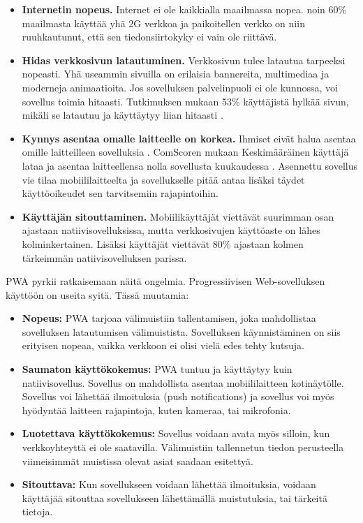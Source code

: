 \documentclass{tktltiki}
\begin{document}
\begin{itemize}
  \item \textbf{Internetin nopeus.} Internet ei ole kaikkialla maailmassa nopea. noin 60\% maailmasta käyttää yhä 2G verkkoa \cite{Kapoor} ja paikoitellen verkko on niin ruuhkautunut, että sen tiedonsiirtokyky ei vain ole riittävä.
  \item \textbf{Hidas verkkosivun latautuminen.} Verkkosivun tulee latautua tarpeeksi nopeasti. Yhä useammin sivuilla on erilaisia bannereita, multimediaa ja moderneja animaatioita. Jos sovelluksen palvelinpuoli ei ole kunnossa, voi sovellus toimia hitaasti. Tutkimuksen mukaan 53\% käyttäjistä hylkää sivun, mikäli se latautuu ja käyttäytyy liian hitaasti \cite{Kapoor}.
  \item \textbf{Kynnys asentaa omalle laitteelle on korkea.} Ihmiset eivät halua asentaa omille laitteilleen sovelluksia \cite{Kapoor}. ComScoren mukaan Keskimääräinen käyttäjä lataa ja asentaa laitteellensa nolla sovellusta kuukaudessa \cite{Perez}. Asennettu sovellus vie tilaa mobiililaitteelta ja sovellukselle pitää antaa lisäksi täydet käyttöoikeudet sen tarvitsemiin rajapintoihin.
  \item \textbf{Käyttäjän sitouttaminen.} Mobiilikäyttäjät viettävät suurimman osan ajastaan natiivisovelluksissa, mutta verkkosivujen käyttöaste on lähes kolminkertainen. Lisäksi käyttäjät viettävät 80\% ajastaan kolmen tärkeimmän natiivisovelluksen parissa. 
\end{itemize}

PWA pyrkii ratkaisemaan näitä ongelmia. Progressiivisen Web-sovelluksen käyttöön on useita syitä. Tässä muutamia:

\begin{itemize}
  \item \textbf{Nopeus:} PWA tarjoaa välimuistiin tallentamisen, joka mahdollistaa sovelluksen latautumisen välimuistista. Sovelluksen käynnistäminen on siis erityisen nopeaa, vaikka verkkoon ei olisi vielä edes tehty kutsuja.
  \item \textbf{Saumaton käyttökokemus:} PWA tuntuu ja käyttäytyy kuin natiivisovellus. Sovellus on mahdollista asentaa mobiililaitteen kotinäytölle. Sovellus voi lähettää ilmoituksia (push notifications) ja sovellus voi myös hyödyntää laitteen rajapintoja, kuten kameraa, tai mikrofonia. 
  \item \textbf{Luotettava käyttökokemus:} Sovellus voidaan avata myös silloin, kun verkkoyhteyttä ei ole saatavilla. Välimuistiin tallennetun tiedon perusteella viimeisimmät muistissa olevat asiat saadaan esitettyä. 
  \item \textbf{Sitouttava:} Kun sovellukseen voidaan lähettää ilmoituksia, voidaan käyttäjää sitouttaa sovellukseen lähettämällä muistutuksia, tai tärkeitä tietoja. 
\end{itemize}
\end{document}
